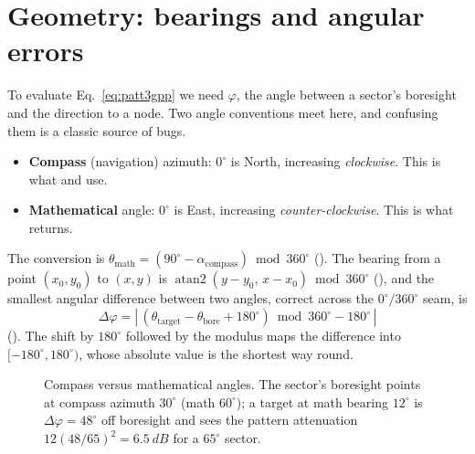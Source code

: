 \section{Geometry: bearings and angular errors}
\label{sec:geometry}

To evaluate Eq.~\eqref{eq:patt3gpp} we need $\varphi$, the angle between a
sector's boresight and the direction to a node. Two angle conventions meet here, and
confusing them is a classic source of bugs.
\begin{itemize}
 \item \textbf{Compass} (navigation) azimuth: $0^\circ$ is North, increasing \emph{clockwise}.
   This is what  and  use.
 \item \textbf{Mathematical} angle: $0^\circ$ is East, increasing \emph{counter-clockwise}.
   This is what  returns.
\end{itemize}
The conversion is $\theta_{\mathrm{math}}=(90^\circ-\alpha_{\mathrm{compass}})\bmod360^\circ$
(). The bearing from a point $(x_0,y_0)$ to $(x,y)$ is
$\operatorname{atan2}(y-y_0,\,x-x_0)\bmod360^\circ$ (), and the
smallest angular difference between two angles, correct across the $0^\circ/360^\circ$ seam, is
\begin{equation}
 \Delta\varphi=\left|\,(\theta_{\mathrm{target}}-\theta_{\mathrm{bore}}+180^\circ)\bmod360^\circ-180^\circ\,\right|
\label{eq:angerr}
\end{equation}
(). The shift by $180^\circ$ followed by the modulus maps the
difference into $[-180^\circ,180^\circ)$, whose absolute value is the shortest
way round.

\begin{figure}[t]
\centering
{}
\caption{Compass versus mathematical angles. The sector's boresight points at compass azimuth $30^\circ$ (math $60^\circ$); a target at math bearing $12^\circ$ is $\Delta\varphi=48^\circ$ off boresight and sees the pattern attenuation $12(48/65)^2=\SI{6.5}{dB}$ for a $65^\circ$ sector.}
\label{fig:angles}
\end{figure}


